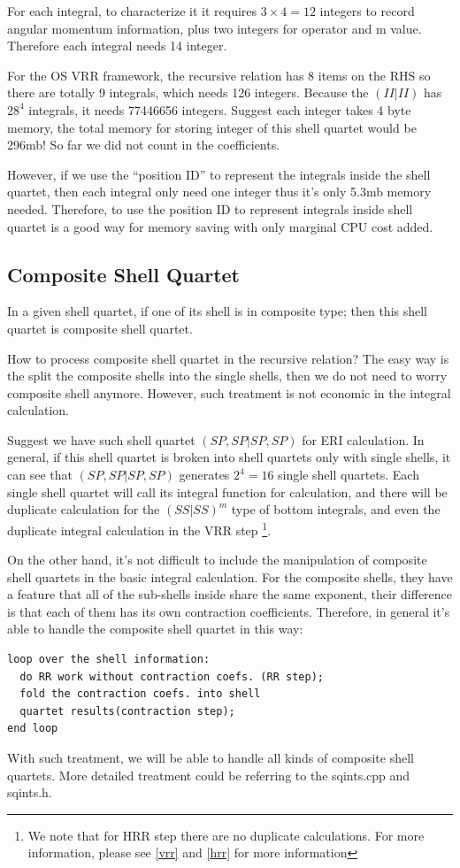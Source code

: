 For each integral, to characterize it it requires $3\times 4 = 12$
integers to record angular momentum information, plus two integers
for operator and m value. Therefore each integral needs 14 integer.

For the OS VRR framework, the recursive relation has 8 items on the 
RHS so there are totally 9 integrals, which needs 126 integers. 
Because the $(II|II)$ has $28^4$ integrals, it needs 77446656 integers.
Suggest each integer takes 4 byte memory, the total memory for 
storing integer of this shell quartet would be 296mb! So far we did not
count in the coefficients.

However, if we use the ``position ID'' to represent the integrals 
inside the shell quartet, then each integral only need one integer 
thus it's only 5.3mb memory needed. Therefore, to use the position 
ID to represent integrals inside shell quartet is a good way for 
memory saving with only marginal CPU cost added.

\subsection{Composite Shell Quartet}
%
%
\label{composite_shell_quartet}

In a given shell quartet, if one of its shell is in composite type; 
then this shell quartet is composite shell quartet. 

How to process composite shell quartet in the recursive relation?
The easy way is the split the composite shells into the single 
shells, then we do not need to worry composite shell anymore. However,
such treatment is not economic in the integral calculation.

Suggest we have such shell quartet $(SP,SP|SP,SP)$ for ERI calculation.
In general, if this shell quartet is broken into shell quartets only 
with single shells, it can see that $(SP,SP|SP,SP)$ generates $2^{4} = 16$
single shell quartets. Each single shell quartet will call its integral
function for calculation, and there will be duplicate calculation for 
the $(SS|SS)^{m}$ type of bottom integrals, and even the duplicate integral calculation
in the VRR step \footnote{We note that for HRR step there are no duplicate calculations.
For more information, please see \ref{vrr} and \ref{hrr} for more 
information}.

On the other hand, it's not difficult to include the manipulation of 
composite shell quartets in the basic integral calculation. For the 
composite shells, they have a feature that all of the sub-shells inside
share the same exponent, their difference is that each of them has its 
own contraction coefficients. Therefore, in general it's able to handle
the composite shell quartet in this way:
\begin{verbatim}
loop over the shell information:
  do RR work without contraction coefs. (RR step);
  fold the contraction coefs. into shell 
  quartet results(contraction step);
end loop
\end{verbatim}
With such treatment, we will be able to handle all kinds of composite
shell quartets. More detailed treatment could be referring to the 
sqints.cpp and sqints.h.

